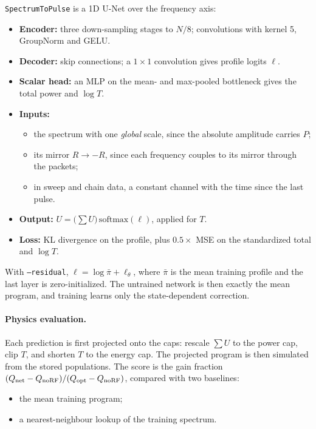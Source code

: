 \documentclass[11pt]{article}
\newcommand{\code}[1]{\texttt{#1}}
\begin{document}
\code{SpectrumToPulse} is a 1D U-Net over the frequency axis:
\begin{itemize}
\item \textbf{Encoder:} three down-sampling stages to \(N/8\); convolutions with kernel 5,
GroupNorm and GELU.
\item \textbf{Decoder:} skip connections; a \(1\times1\) convolution gives profile logits \(\ell\).
\item \textbf{Scalar head:} an MLP on the mean- and max-pooled bottleneck gives the total power
and \(\log T\).
\item \textbf{Inputs:}
  \begin{itemize}
  \item the spectrum with one \emph{global} scale, since the absolute amplitude carries \(P\);
  \item its mirror \(R\to-R\), since each frequency couples to its mirror through the packets;
  \item in sweep and chain data, a constant channel with the time since the last pulse.
  \end{itemize}
\item \textbf{Output:} \(U=\bigl(\sum U\bigr)\,\mathrm{softmax}(\ell)\), applied for \(T\).
\item \textbf{Loss:} KL divergence on the profile, plus \(0.5\times\) MSE on the standardized
total and \(\log T\).
\end{itemize}
With \code{--residual}, \(\ell=\log\bar\pi+\ell_\theta\), where \(\bar\pi\) is the mean training
profile and the last layer is zero-initialized. The untrained network is then exactly the mean
program, and training learns only the state-dependent correction.

\paragraph{Physics evaluation.} Each prediction is first projected onto the caps: rescale
\(\sum U\) to the power cap, clip \(T\), and shorten \(T\) to the energy cap. The projected
program is then simulated from the stored populations. The score is the gain fraction
\((Q_{\rm net}-Q_{\rm noRF})/(Q_{\rm opt}-Q_{\rm noRF})\), compared with two baselines:
\begin{itemize}
\item the mean training program;
\item a nearest-neighbour lookup of the training spectrum.
\end{itemize}
\end{document}
